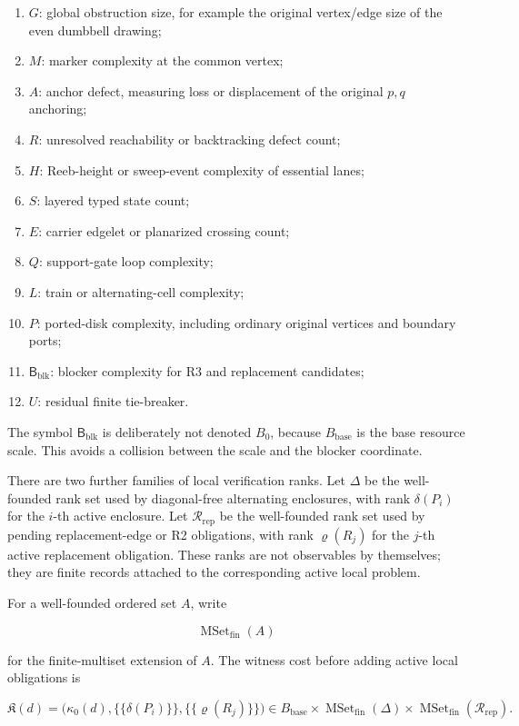 \documentclass[11pt]{amsart}
\theoremstyle{definition}
\begin{document}
\begin{enumerate}
\item \(G\): global obstruction size, for example the original vertex/edge size of the even dumbbell drawing;
\item \(M\): marker complexity at the common vertex;
\item \(A\): anchor defect, measuring loss or displacement of the original \(p,q\) anchoring;
\item \(R\): unresolved reachability or backtracking defect count;
\item \(H\): Reeb-height or sweep-event complexity of essential lanes;
\item \(S\): layered typed state count;
\item \(E\): carrier edgelet or planarized crossing count;
\item \(Q\): support-gate loop complexity;
\item \(L\): train or alternating-cell complexity;
\item \(P\): ported-disk complexity, including ordinary original vertices and boundary ports;
\item \(\mathsf B_{\mathrm{blk}}\): blocker complexity for R3 and replacement candidates;
\item \(U\): residual finite tie-breaker.
\end{enumerate}

The symbol \(\mathsf B_{\mathrm{blk}}\) is deliberately not denoted \(B_0\), because \(B_{\mathrm{base}}\) is the base resource scale. This avoids a collision between the scale and the blocker coordinate.

There are two further families of local verification ranks. Let \(\Delta\) be the
well-founded rank set used by diagonal-free alternating enclosures, with rank
\(\delta(P_i)\) for the \(i\)-th active enclosure. Let
\(\mathcal R_{\mathrm{rep}}\) be the well-founded rank set used by pending
replacement-edge or R2 obligations, with rank \(\varrho(R_j)\) for the \(j\)-th
active replacement obligation. These ranks are not observables by themselves;
they are finite records attached to the corresponding active local problem.

For a well-founded ordered set \(A\), write

\[
\operatorname{MSet}_{\mathrm{fin}}(A)
\]

for the finite-multiset extension of \(A\). The witness cost before adding active
local obligations is

\[
\mathfrak K(d)=
\bigl(
\kappa_0(d),
\{\!\{\delta(P_i)\}\!\},
\{\!\{\varrho(R_j)\}\!\}
\bigr)
\in
B_{\mathrm{base}}
\times
\operatorname{MSet}_{\mathrm{fin}}(\Delta)
\times
\operatorname{MSet}_{\mathrm{fin}}(\mathcal R_{\mathrm{rep}}).
\]
\end{document}
